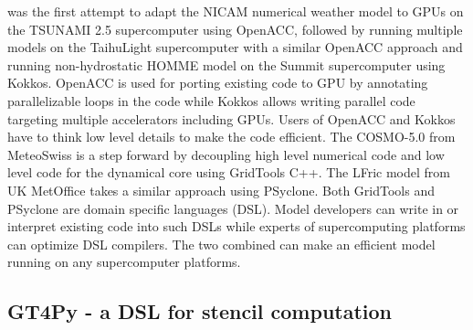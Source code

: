 \documentclass[]{article}
\begin{document}
\cite{Yashiro2016} was the first attempt to adapt the NICAM numerical weather model to GPUs on the TSUNAMI 2.5 supercomputer using OpenACC, followed by \cite{Fu2017} running multiple models on the TaihuLight supercomputer with a similar OpenACC approach and \cite{Bertagna2020} running non-hydrostatic HOMME model on the Summit supercomputer using Kokkos. OpenACC is used for porting existing code to GPU by annotating parallelizable loops in the code while Kokkos allows writing parallel code targeting multiple accelerators including GPUs. Users of OpenACC and Kokkos have to think low level details to make the code efficient. The COSMO-5.0 from MeteoSwiss\citep{Fuhrer2018} is a step forward by decoupling high level numerical code and low level code for the dynamical core using GridTools C++. The LFric model from UK MetOffice takes a similar approach using PSyclone\citep{Adams2019}. Both GridTools and PSyclone are domain specific languages (DSL). Model developers can write in or interpret existing code into such DSLs while experts of supercomputing platforms can optimize DSL compilers. The two combined can make an efficient model running on any supercomputer platforms.

\subsection{GT4Py - a DSL for stencil computation}
\end{document}
